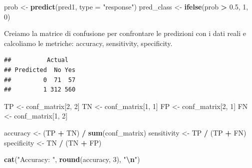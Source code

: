 \documentclass[
]{article}
\newenvironment{Shaded}{\begin{snugshade}}{\end{snugshade}}
\newcommand{\AttributeTok}[1]{\textcolor[rgb]{0.13,0.29,0.53}{#1}}
\newcommand{\DecValTok}[1]{\textcolor[rgb]{0.00,0.00,0.81}{#1}}
\newcommand{\FloatTok}[1]{\textcolor[rgb]{0.00,0.00,0.81}{#1}}
\newcommand{\FunctionTok}[1]{\textcolor[rgb]{0.13,0.29,0.53}{\textbf{#1}}}
\newcommand{\NormalTok}[1]{#1}
\newcommand{\OtherTok}[1]{\textcolor[rgb]{0.56,0.35,0.01}{#1}}
\newcommand{\SpecialCharTok}[1]{\textcolor[rgb]{0.81,0.36,0.00}{\textbf{#1}}}
\newcommand{\StringTok}[1]{\textcolor[rgb]{0.31,0.60,0.02}{#1}}
\begin{document}
\begin{Shaded}
\begin{Highlighting}[]
\NormalTok{prob }\OtherTok{\textless{}{-}} \FunctionTok{predict}\NormalTok{(pred1, }\AttributeTok{type =} \StringTok{"response"}\NormalTok{)}
\NormalTok{pred\_class }\OtherTok{\textless{}{-}} \FunctionTok{ifelse}\NormalTok{(prob }\SpecialCharTok{\textgreater{}} \FloatTok{0.5}\NormalTok{, }\DecValTok{1}\NormalTok{, }\DecValTok{0}\NormalTok{)}
\end{Highlighting}
\end{Shaded}

Creiamo la matrice di confusione per confrontare le predizioni con i
dati reali e calcoliamo le metriche: accuracy, sensitivity, specificity.

\begin{Shaded}
\end{Shaded}

\begin{verbatim}
##          Actual
## Predicted  No Yes
##         0  71  57
##         1 312 560
\end{verbatim}

\begin{Shaded}
\begin{Highlighting}[]
\NormalTok{TP }\OtherTok{\textless{}{-}}\NormalTok{ conf\_matrix[}\DecValTok{2}\NormalTok{, }\DecValTok{2}\NormalTok{]}
\NormalTok{TN }\OtherTok{\textless{}{-}}\NormalTok{ conf\_matrix[}\DecValTok{1}\NormalTok{, }\DecValTok{1}\NormalTok{]}
\NormalTok{FP }\OtherTok{\textless{}{-}}\NormalTok{ conf\_matrix[}\DecValTok{2}\NormalTok{, }\DecValTok{1}\NormalTok{]}
\NormalTok{FN }\OtherTok{\textless{}{-}}\NormalTok{ conf\_matrix[}\DecValTok{1}\NormalTok{, }\DecValTok{2}\NormalTok{]}

\NormalTok{accuracy }\OtherTok{\textless{}{-}}\NormalTok{ (TP }\SpecialCharTok{+}\NormalTok{ TN) }\SpecialCharTok{/} \FunctionTok{sum}\NormalTok{(conf\_matrix)}
\NormalTok{sensitivity }\OtherTok{\textless{}{-}}\NormalTok{ TP }\SpecialCharTok{/}\NormalTok{ (TP }\SpecialCharTok{+}\NormalTok{ FN) }
\NormalTok{specificity }\OtherTok{\textless{}{-}}\NormalTok{ TN }\SpecialCharTok{/}\NormalTok{ (TN }\SpecialCharTok{+}\NormalTok{ FP) }

\FunctionTok{cat}\NormalTok{(}\StringTok{"Accuracy: "}\NormalTok{, }\FunctionTok{round}\NormalTok{(accuracy, }\DecValTok{3}\NormalTok{), }\StringTok{"}\SpecialCharTok{\textbackslash{}n}\StringTok{"}\NormalTok{)}
\end{Highlighting}
\end{Shaded}
\end{document}
